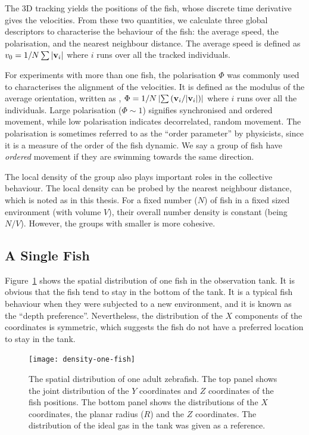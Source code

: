 \documentclass[11pt,twoside]{report}
\begin{document}
The 3D tracking yields the positions of the fish, whose discrete time derivative gives the velocities. From these two quantities, we calculate three global descriptors to characterise the behaviour of the fish: the average speed, the polarisation, and the nearest neighbour distance. The average speed is defined as $v_0 = 1/N \sum{| \mathbf{v}_{i} |}$ where $i$ runs over all the tracked individuals. 

For experiments with more than one fish, the polarisation $\Phi$ was commonly used to characterises the alignment of the velocities. It is defined as the modulus of the average orientation, written as \cite{attanasi2014pcb},
$\Phi = 1/N \left| \sum{({ \mathbf{v}_{i} }/{|  \mathbf{v}_{i} |}}) \right|$ where $i$ runs over all the individuals. Large polarisation ($\Phi \sim 1$) signifies synchronised and ordered movement, while low polarisation indicates decorrelated, random movement. The polarisation is sometimes referred to as the ``order parameter'' by physicists, since it is a measure of the order of the fish dynamic. We say a group of fish have \emph{ordered} movement if they are swimming towards the same direction.

The local density of the group also plays important roles in the collective behaviour. The local density can be probed by the nearest neighbour distance, which is noted as {\dnn} in this thesis. For a fixed number ($N$) of fish in a fixed sized environment (with volume $V$), their overall number density is constant (being $N/V$). However, the groups with smaller {\dnn} is more cohesive.


\subsection{A Single Fish}
\label{section:fish_1_3d}


Figure~\ref{fig:density_3d_fish_1} shows the spatial distribution of one fish in the observation tank. It is obvious that the fish tend to stay in the bottom of the tank. It is a typical fish behaviour when they were subjected to a new environment, and it is known as the ``depth preference''.
Nevertheless, the distribution of the $X$ components of the coordinates is symmetric, which suggests the fish do not have a preferred location to stay in the tank.


\begin{figure}
  \texttt{[image: density-one-fish]}
  \caption[The 3D spatial distribution of one fish]{The spatial distribution of one adult zebrafish. The top panel shows the joint distribution of the $Y$ coordinates and $Z$ coordinates of the fish positions. The bottom panel shows the distributions of the $X$ coordinates, the planar radius ($R$) and the $Z$ coordinates. The distribution of the ideal gas in the tank was given as a reference.}
  \label{fig:density_3d_fish_1}
\end{figure}
\end{document}
